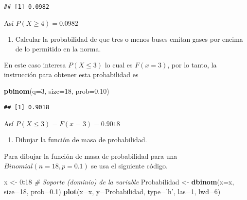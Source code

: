 \documentclass[10pt,]{krantz}
\makeatletter
\newenvironment{Shaded}{\begin{snugshade}}{\end{snugshade}}
\newcommand{\KeywordTok}[1]{\textcolor[rgb]{0.13,0.29,0.53}{\textbf{#1}}}
\newcommand{\DataTypeTok}[1]{\textcolor[rgb]{0.13,0.29,0.53}{#1}}
\newcommand{\DecValTok}[1]{\textcolor[rgb]{0.00,0.00,0.81}{#1}}
\newcommand{\FloatTok}[1]{\textcolor[rgb]{0.00,0.00,0.81}{#1}}
\newcommand{\StringTok}[1]{\textcolor[rgb]{0.31,0.60,0.02}{#1}}
\newcommand{\CommentTok}[1]{\textcolor[rgb]{0.56,0.35,0.01}{\textit{#1}}}
\newcommand{\OperatorTok}[1]{\textcolor[rgb]{0.81,0.36,0.00}{\textbf{#1}}}
\newcommand{\NormalTok}[1]{#1}
\providecommand{\tightlist}{%
  \setlength{\itemsep}{0pt}\setlength{\parskip}{0pt}}
\newenvironment{kframe}{%
\medskip{}
\setlength{\fboxsep}{.8em}
 \def\at@end@of@kframe{}%
 \ifinner\ifhmode%
  \def\at@end@of@kframe{\end{minipage}}%
  \begin{minipage}{\columnwidth}%
 \fi\fi%
 \def\FrameCommand##1{\hskip\@totalleftmargin \hskip-\fboxsep
 \colorbox{shadecolor}{##1}\hskip-\fboxsep
     \hskip-\linewidth \hskip-\@totalleftmargin \hskip\columnwidth}%
 \MakeFramed {\advance\hsize-\width
   \@totalleftmargin\z@ \linewidth\hsize
   \@setminipage}}%
 {\par\unskip\endMakeFramed%
 \at@end@of@kframe}
\renewenvironment{Shaded}{\begin{kframe}}{\end{kframe}}
\makeatother
\begin{document}
\begin{verbatim}
## [1] 0.0982
\end{verbatim}

Así \(P(X \geq 4)=0.0982\)

\begin{enumerate}
\def\labelenumi{\arabic{enumi})}
\setcounter{enumi}{2}
\tightlist
\item
  Calcular la probabilidad de que tres o menos buses emitan gases por
  encima de lo permitido en la norma.
\end{enumerate}

En este caso interesa \(P(X\leq3)\) lo cual es \(F(x=3)\), por lo tanto,
la instrucción para obtener esta probabilidad es

\begin{Shaded}
\begin{Highlighting}[]
\KeywordTok{pbinom}\NormalTok{(}\DataTypeTok{q=}\DecValTok{3}\NormalTok{, }\DataTypeTok{size=}\DecValTok{18}\NormalTok{, }\DataTypeTok{prob=}\FloatTok{0.10}\NormalTok{)}
\end{Highlighting}
\end{Shaded}

\begin{verbatim}
## [1] 0.9018
\end{verbatim}

Así \(P(X\leq3)=F(x=3)=0.9018\)

\begin{enumerate}
\def\labelenumi{\arabic{enumi})}
\setcounter{enumi}{3}
\tightlist
\item
  Dibujar la función de masa de probabilidad.
\end{enumerate}

Para dibujar la función de masa de probabilidad para una
\(Binomial(n=18, p=0.1)\) se usa el siguiente código.

\begin{Shaded}
\begin{Highlighting}[]
\NormalTok{x <-}\StringTok{ }\DecValTok{0}\OperatorTok{:}\DecValTok{18}  \CommentTok{# Soporte (dominio) de la variable}
\NormalTok{Probabilidad <-}\StringTok{ }\KeywordTok{dbinom}\NormalTok{(}\DataTypeTok{x=}\NormalTok{x, }\DataTypeTok{size=}\DecValTok{18}\NormalTok{, }\DataTypeTok{prob=}\FloatTok{0.1}\NormalTok{)}
\KeywordTok{plot}\NormalTok{(}\DataTypeTok{x=}\NormalTok{x, }\DataTypeTok{y=}\NormalTok{Probabilidad, }
     \DataTypeTok{type=}\StringTok{'h'}\NormalTok{, }\DataTypeTok{las=}\DecValTok{1}\NormalTok{, }\DataTypeTok{lwd=}\DecValTok{6}\NormalTok{)}
\end{Highlighting}
\end{Shaded}
\end{document}
